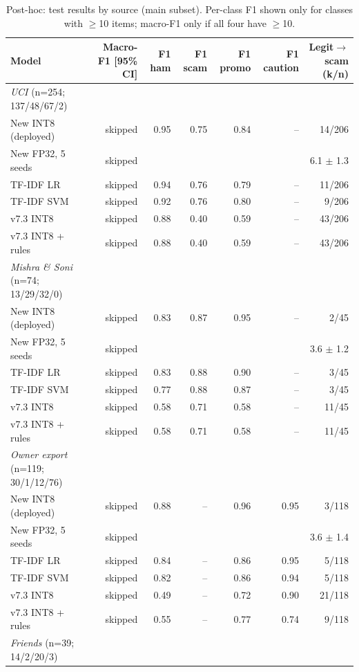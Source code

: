 \begin{table}[t]
\centering
\caption{Post-hoc: test results by source (main subset). Per-class F1 shown only for classes with $\geq$10 items; macro-F1 only if all four have $\geq$10.}
\label{tab:ph_source}
\small
\begin{tabular}{lrrrrrr}
\toprule
Model & Macro-F1 [95\% CI] & F1 ham & F1 scam & F1 promo & F1 caution & Legit$\to$scam (k/n) \\
\midrule
\textit{UCI} (n=254; 137/48/67/2) &  &  &  &  &  &  \\
New INT8 (deployed) & skipped & 0.95 & 0.75 & 0.84 & -- & 14/206 \\
New FP32, 5 seeds & skipped &  &  &  &  & 6.1 $\pm$ 1.3 \\
TF-IDF LR & skipped & 0.94 & 0.76 & 0.79 & -- & 11/206 \\
TF-IDF SVM & skipped & 0.92 & 0.76 & 0.80 & -- & 9/206 \\
v7.3 INT8 & skipped & 0.88 & 0.40 & 0.59 & -- & 43/206 \\
v7.3 INT8 + rules & skipped & 0.88 & 0.40 & 0.59 & -- & 43/206 \\
\textit{Mishra \& Soni} (n=74; 13/29/32/0) &  &  &  &  &  &  \\
New INT8 (deployed) & skipped & 0.83 & 0.87 & 0.95 & -- & 2/45 \\
New FP32, 5 seeds & skipped &  &  &  &  & 3.6 $\pm$ 1.2 \\
TF-IDF LR & skipped & 0.83 & 0.88 & 0.90 & -- & 3/45 \\
TF-IDF SVM & skipped & 0.77 & 0.88 & 0.87 & -- & 3/45 \\
v7.3 INT8 & skipped & 0.58 & 0.71 & 0.58 & -- & 11/45 \\
v7.3 INT8 + rules & skipped & 0.58 & 0.71 & 0.58 & -- & 11/45 \\
\textit{Owner export} (n=119; 30/1/12/76) &  &  &  &  &  &  \\
New INT8 (deployed) & skipped & 0.88 & -- & 0.96 & 0.95 & 3/118 \\
New FP32, 5 seeds & skipped &  &  &  &  & 3.6 $\pm$ 1.4 \\
TF-IDF LR & skipped & 0.84 & -- & 0.86 & 0.95 & 5/118 \\
TF-IDF SVM & skipped & 0.82 & -- & 0.86 & 0.94 & 5/118 \\
v7.3 INT8 & skipped & 0.49 & -- & 0.72 & 0.90 & 21/118 \\
v7.3 INT8 + rules & skipped & 0.55 & -- & 0.77 & 0.74 & 9/118 \\
\textit{Friends} (n=39; 14/2/20/3) &  &  &  &  &  &  \\

\end{tabular}
\end{table}
